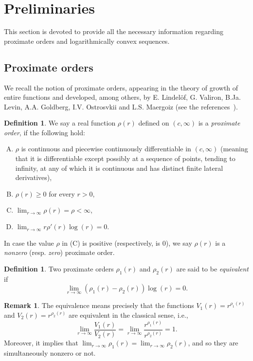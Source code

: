 \documentclass[11pt,a4paper]{article}
\theoremstyle{definition}
\newtheorem{defi}[theo]{Definition}
\newtheorem{rema}[theo]{Remark}
\newenvironment{den}{\smallskip\begin{defi}}{\end{defi}\smallskip}
\def\oo{\infty}
\def\ri{\rightarrow}
\def\ro{\rho}
\def\no{\nonumber}
\begin{document}
\section{Preliminaries}

This section is devoted to provide all the necessary information regarding proximate orders and logarithmically convex sequences.

\subsection{Proximate orders}

We recall the notion of proximate orders, appearing in the theory of growth of entire functions and developed, among others, by E. Lindel\"of, G. Valiron, B.Ja. Levin, A.A. Goldberg, I.V. Ostrosvkii and L.S. Maergoiz (see the references~\cite{Valiron42,Levin,GoldbergOstrowskii,Maergoiz}).

\begin{den}\label{OAD:1}
We say a real function $\ro(r)$ defined on $(c,\oo)$  is a {\it proximate order},
if the following hold:
 \begin{enumerate}[(A)]
  \item $\ro$ is continuous and piecewise continuously differentiable in $(c,\oo)$ (meaning that it is differentiable except possibly at a sequence of points, tending to infinity, at any of which it is continuous and has distinct finite lateral derivatives),\label{OA1:1}
  \item $\ro(r) \geq 0$ for every $r>0$,\label{OA2:1}
  \item $\lim_{r \ri \oo} \ro(r)=\ro< \oo$, \label{OA3:1}
  \item $\lim_{r  \ri \oo} r \ro'(r) \log(r) = 0$. \label{OA4:1}
 \end{enumerate}
In case the value $\rho$ in (C) is positive (respectively, is 0), we say $\rho(r)$ is a \textit{nonzero} (resp. \textit{zero}) proximate order.
\end{den}


\begin{den}\label{defiEquivalentProxOrders}
Two proximate orders $\ro_1(r)$ and $\ro_2(r)$ are said to be {\it equivalent} if
 \begin{equation}
  \lim_{r \ri \oo} (\ro_1(r) - \ro_2(r)) \log(r) = 0 . \no
 \end{equation}
\end{den}

\begin{rema}\label{remaEquivProxOrder}
The equivalence means precisely that the functions $V_1(r)=r^{\ro_1(r)}$ and $V_2(r)=r^{\ro_2(r)}$ are equivalent in the classical sense, i.e.,
$$\lim_{r\ri\oo} \frac{V_1(r)}{V_2(r)}=
\lim_{r\ri\oo}\frac{r^{\ro_1(r)}}{r^{\ro_2(r)}} = 1.$$
Moreover, it implies that $\lim_{r\ri\oo}\ro_1(r) = \lim_{r\ri\oo}\ro_2(r)$, and so they are simultaneously nonzero or not.
\end{rema}
\end{document}
